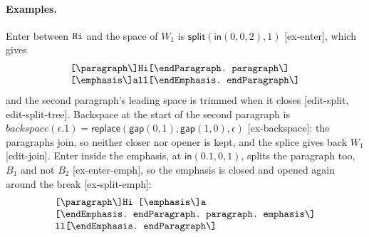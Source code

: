 \documentclass[11pt]{article}
\numberwithin{equation}{section}
\newcommand{\kw}[1]{\ensuremath{\mathsf{#1}}}
\newcommand{\str}[1]{\ensuremath{\text{\texttt{#1}}}}
\newcommand{\bs}{\textbackslash}
\begin{document}
\paragraph{Examples.}  Enter between $\str{Hi}$ and the space of $W_1$ is
$\kw{split}(\kw{in}(0, 0, 2), 1)$ [ex-enter], which gives
\[
\begin{array}{@{}l@{}}
\str{[\bs{}paragraph\bs]Hi[\bs{}endParagraph.\ paragraph\bs]\ } \\
\str{[\bs{}emphasis\bs]all[\bs{}endEmphasis.\ endParagraph\bs]}
\end{array}
\]
and the second paragraph's leading space is trimmed when it closes
[edit-split, edit-split-tree].  Backspace at the start of the second
paragraph is $\mathit{backspace}(\epsilon.1) = \kw{replace}(\kw{gap}(0,
1), \kw{gap}(1, 0), \epsilon)$ [ex-backspace]: the paragraphs join, so
neither closer nor opener is kept, and the splice gives back $W_1$
[edit-join].  Enter inside the emphasis, at
$\kw{in}(0.1, 0, 1)$, splits the paragraph too, $B_1$ and not $B_2$
[ex-enter-emph], so the emphasis is closed and opened again around the
break [ex-split-emph]:
\[
\begin{array}{@{}l@{}}
\str{[\bs{}paragraph\bs]Hi\ [\bs{}emphasis\bs]a} \\
\str{[\bs{}endEmphasis.\ endParagraph.\ paragraph.\ emphasis\bs]} \\
\str{ll[\bs{}endEmphasis.\ endParagraph\bs]}
\end{array}
\]
\end{document}
